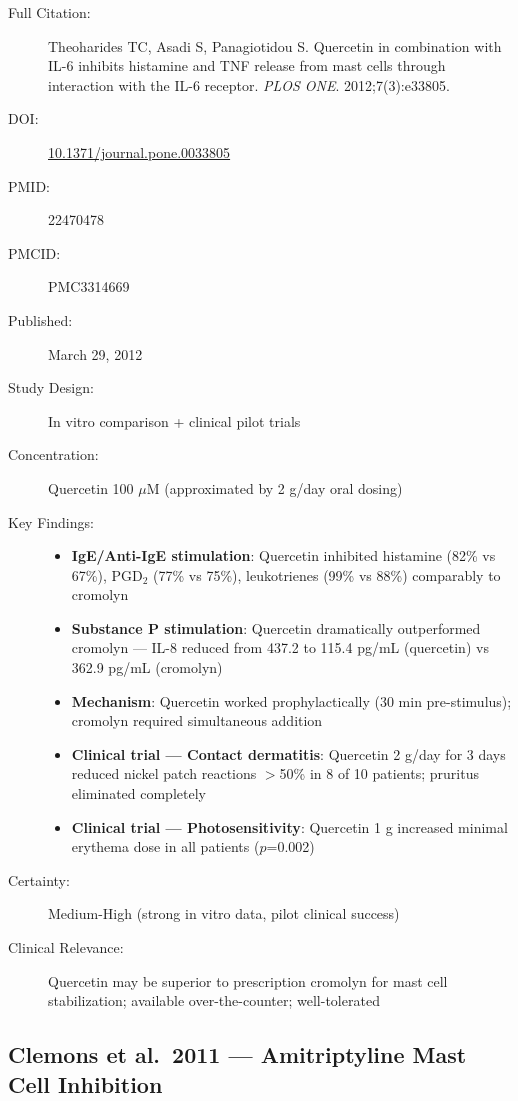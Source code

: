 \begin{description}
    \item[Full Citation:] Theoharides TC, Asadi S, Panagiotidou S. Quercetin in combination with IL-6 inhibits histamine and TNF release from mast cells through interaction with the IL-6 receptor. \textit{PLOS ONE}. 2012;7(3):e33805.
    \item[DOI:] \href{https://doi.org/10.1371/journal.pone.0033805}{10.1371/journal.pone.0033805}
    \item[PMID:] 22470478
    \item[PMCID:] PMC3314669
    \item[Published:] March 29, 2012
    \item[Study Design:] In vitro comparison + clinical pilot trials
    \item[Concentration:] Quercetin 100 $\mu$M (approximated by 2 g/day oral dosing)
    \item[Key Findings:]
    \begin{itemize}
        \item \textbf{IgE/Anti-IgE stimulation}: Quercetin inhibited histamine (82\% vs 67\%), PGD$_2$ (77\% vs 75\%), leukotrienes (99\% vs 88\%) comparably to cromolyn
        \item \textbf{Substance P stimulation}: Quercetin dramatically outperformed cromolyn --- IL-8 reduced from 437.2 to 115.4 pg/mL (quercetin) vs 362.9 pg/mL (cromolyn)
        \item \textbf{Mechanism}: Quercetin worked prophylactically (30 min pre-stimulus); cromolyn required simultaneous addition
        \item \textbf{Clinical trial --- Contact dermatitis}: Quercetin 2 g/day for 3 days reduced nickel patch reactions $>$50\% in 8 of 10 patients; pruritus eliminated completely
        \item \textbf{Clinical trial --- Photosensitivity}: Quercetin 1 g increased minimal erythema dose in all patients ($p$=0.002)
    \end{itemize}
    \item[Certainty:] Medium-High (strong in vitro data, pilot clinical success)
    \item[Clinical Relevance:] Quercetin may be superior to prescription cromolyn for mast cell stabilization; available over-the-counter; well-tolerated
\end{description}

\subsection{Clemons et al.\ 2011 --- Amitriptyline Mast Cell Inhibition}

